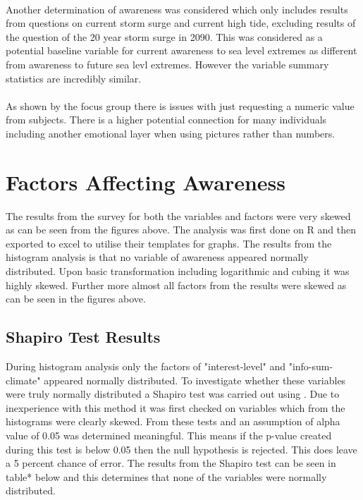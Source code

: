 \paragraph{}
Another determination of awareness was considered which only includes results from questions on current storm surge and current high tide, excluding results of the question of the 20 year storm surge in 2090. This was considered as a potential baseline variable for current awareness to sea level extremes as different from awareness to future sea levl extremes. However the variable summary statistics are incredibly similar. 




\paragraph{}
As shown by the focus group there is issues with just requesting a numeric value from subjects. There is a higher potential connection for many individuals including another emotional layer when using pictures rather than numbers. 

\section{Factors Affecting Awareness}
The results from the survey for both the variables and factors were very skewed as can be seen from the figures above. The analysis was first done on R and then exported to excel to utilise their templates for graphs. The results from the histogram analysis is that no variable of awareness appeared normally distributed. Upon basic transformation including logarithmic and cubing it was highly skewed. Further more almost all factors from the results were skewed as can be seen in the figures above.   

\subsection{Shapiro Test Results}

During histogram analysis only the factors of "interest-level" and "info-sum-climate" appeared normally distributed. To investigate whether these variables were truly normally distributed a Shapiro test was carried out using \cite{royston_extension_1982} . Due to inexperience with this method it was first checked on variables which from the histograms were clearly skewed. From these tests and \cite{royston_extension_1982} an assumption of alpha value of 0.05 was determined meaningful. This means if the p-value created during this test is below 0.05 then the null hypothesis is rejected. This does leave a 5 percent chance of error. The results from the Shapiro test can be seen in table* below and this determines that none of the variables were normally distributed. 

